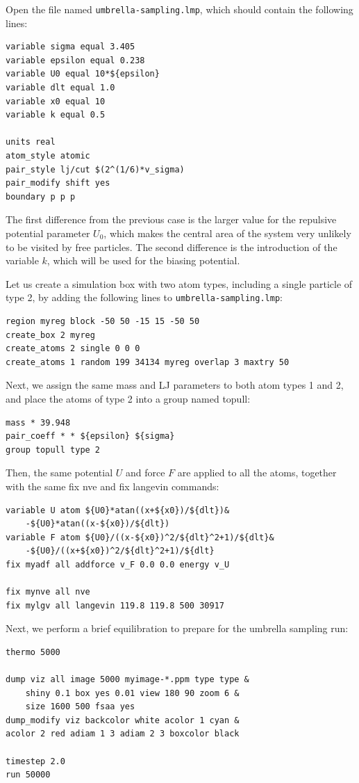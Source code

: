 \documentclass[9pt,tutorial]{livecoms}
\newcommand{\lmpcmd}[1]{\colorbox{listing}{\textcolor{command}{\small{#1}}}} %
\newcommand{\flecmd}[1]{\textcolor{command}{\texttt{#1}}} %
\begin{document}
Open the file named \flecmd{umbrella-sampling.lmp}, which should
contain the following lines:
\begin{lstlisting}
variable sigma equal 3.405
variable epsilon equal 0.238
variable U0 equal 10*${epsilon}
variable dlt equal 1.0
variable x0 equal 10
variable k equal 0.5

units real
atom_style atomic
pair_style lj/cut $(2^(1/6)*v_sigma)
pair_modify shift yes
boundary p p p
\end{lstlisting}
The first difference from the previous case is the larger value
for the repulsive potential parameter $U_0$, which makes the central area
of the system very unlikely to be visited by free particles.  The second
difference is the introduction of the variable $k$, which will be used for
the biasing potential.

Let us create a simulation box with two atom types, including a single particle of type 2,
by adding the following lines to \flecmd{umbrella-sampling.lmp}:
\begin{lstlisting}
region myreg block -50 50 -15 15 -50 50
create_box 2 myreg
create_atoms 2 single 0 0 0
create_atoms 1 random 199 34134 myreg overlap 3 maxtry 50
\end{lstlisting}
Next, we assign the same mass and LJ parameters to both atom types
1 and 2, and place the atoms of type 2 into a group named \lmpcmd{topull}:
\begin{lstlisting}
mass * 39.948
pair_coeff * * ${epsilon} ${sigma}
group topull type 2
\end{lstlisting}
Then, the same potential $U$ and force $F$ are applied to all the atoms,
together with the same \lmpcmd{fix nve} and \lmpcmd{fix langevin} commands:
\begin{lstlisting}
variable U atom ${U0}*atan((x+${x0})/${dlt})&
    -${U0}*atan((x-${x0})/${dlt})
variable F atom ${U0}/((x-${x0})^2/${dlt}^2+1)/${dlt}&
    -${U0}/((x+${x0})^2/${dlt}^2+1)/${dlt}
fix myadf all addforce v_F 0.0 0.0 energy v_U

fix mynve all nve
fix mylgv all langevin 119.8 119.8 500 30917
\end{lstlisting}
Next, we perform a brief equilibration to prepare for the
umbrella sampling run:
\begin{lstlisting}
thermo 5000

dump viz all image 5000 myimage-*.ppm type type &
    shiny 0.1 box yes 0.01 view 180 90 zoom 6 &
    size 1600 500 fsaa yes
dump_modify viz backcolor white acolor 1 cyan &
acolor 2 red adiam 1 3 adiam 2 3 boxcolor black

timestep 2.0
run 50000
\end{lstlisting}
\end{document}
